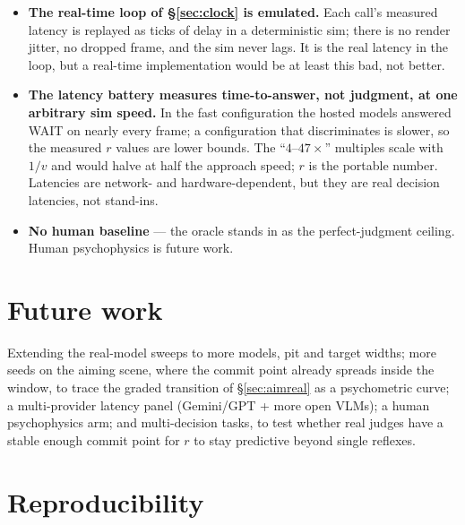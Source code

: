 \documentclass[11pt]{article}
\begin{document}
\begin{itemize}
{    models at medium effort and one local 7B model.} The cue prompt is the \S\ref{sec:real} judge's,
    so the cue-arm numbers are that judge's single-frame accuracy at a lower
    effort than the sweep used; a prompt that named a different cue, or a
    scene without a pixel-sharp cue, could land anywhere between the two
    arms. Judges are blind to coordinates and labels but not to the task. The
    local model's chance result is an instruction-following failure (a
    constant answer), not a measurement of its depth perception.
  \item \textbf{The real-time loop of \S\ref{sec:clock} is emulated.}
    Each call's measured latency is replayed as ticks of delay in a
    deterministic sim; there is no render jitter, no dropped frame, and the
    sim never lags. It is the real latency in the loop, but a real-time
    implementation would be at least this bad, not better.
  \item \textbf{The latency battery measures time-to-answer, not judgment,
    at one arbitrary sim speed.} In the fast configuration the hosted models
    answered WAIT on nearly every frame; a configuration that discriminates is
    slower, so the measured $r$ values are lower bounds. The ``$4$--$47\times$''
    multiples scale with $1/v$ and would halve at half the approach speed; $r$
    is the portable number. Latencies are network- and hardware-dependent, but
    they are real decision latencies, not stand-ins.
  \item \textbf{No human baseline} --- the oracle stands in as the
    perfect-judgment ceiling. Human psychophysics is future work.
\end{itemize}

\section{Future work}

Extending the real-model sweeps to more models, pit and target widths; more
seeds on the aiming scene, where the commit point already spreads inside the
window, to trace the graded transition of \S\ref{sec:aimreal} as a
psychometric curve; a multi-provider latency
panel (Gemini/GPT + more open VLMs); a human psychophysics arm; and
multi-decision tasks, to test whether real judges have a stable enough commit
point for $r$ to stay predictive beyond single reflexes.

\section*{Reproducibility}
\end{document}
